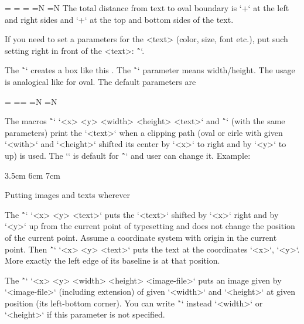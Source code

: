 {\begtt
\ovalparams={\roundness=2pt           %
             \fcolor=\Yellow          %
             \lcolor=\Red             %
             \lwidth=0.5bp            %
             \shadow=N                %
             \overlapmargins=N        %
             \hhkern=0pt \vvkern=0pt} %
\endtt
The total distance from text to oval boundary is `\hhkern+\roundness` at the left and right
sides and
`\vvkern+\roundness` at the top and bottom sides of the text.

If you need to set a parameters for the <text> (color, size, font etc.),
put such setting right in front of the <text>:
\^``.

\new
The \^`` creates a box like this .
The \^`\ratio` parameter means width/height. The usage is analogical like for oval.
The default parameters are

\begtt
\circleparams={ \fcolor=\Yellow \lcolor=\Red \lwidth=0.5bp
               \shadow=N \ignoremargins=N \hhkern=2pt \vvkern=2pt}
\endtt

\new
The macros \^`\clipinoval` `<x> <y> <width> <height> {<text>}`
and \^`\clipincircle` (with the same parameters)
print the `<text>` when a clipping path (oval or cirle with given
`<with>` and `<height>` shifted its center by `<x>` to right and by `<y>` to up)
is used.
The `\roundness=5mm` is default for \^`\clipinoval` and user can change it.
Example:

\begtt
\clipincircle 3cm 3.5cm 6cm 7cm {\picw=6cm }
\endtt

\secc Putting images and texts wherever

\new
The \^`\puttext` `<x> <y> {<text>}` puts the `<text>` shifted by `<x>` right and by
`<y>` up from the current point of typesetting and does not change the
position of the current point. Assume a coordinate system with origin in the
current point. Then \^`\puttext` `<x> <y> {<text>}` puts the text at the
coordinates `<x>`, `<y>`. More exactly the left edge of its baseline is at that
position.

\new
The \^`\putpic` `<x> <y> <width> <height> {<image-file>}` puts an image
given by `<image-file>` (including extension) of given
`<width>` and `<height>` at given position (its left-bottom corner).
You can write \^`\nospec` instead `<width>` or `<height>` if this parameter
is not specified.

}
